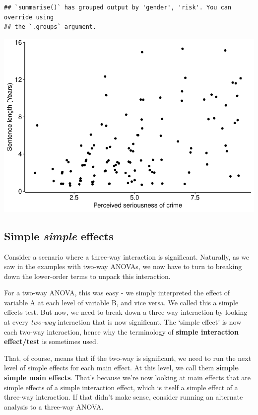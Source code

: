 \documentclass[
]{book}
\begin{document}
\begin{verbatim}
## `summarise()` has grouped output by 'gender', 'risk'. You can override using
## the `.groups` argument.
\end{verbatim}

\includegraphics{_main_files/figure-latex/unnamed-chunk-266-1.pdf}

\subsection{\texorpdfstring{Simple \emph{simple} effects}{Simple simple effects}}\label{simple-simple-effects}

Consider a scenario where a three-way interaction is significant. Naturally, as we saw in the examples with two-way ANOVAs, we now have to turn to breaking down the lower-order terms to unpack this interaction.

For a two-way ANOVA, this was easy - we simply interpreted the effect of variable A at each level of variable B, and vice versa. We called this a simple effects test. But now, we need to break down a three-way interaction by looking at every \emph{two-way} interaction that is now significant. The `simple effect' is now each two-way interaction, hence why the terminology of \textbf{simple interaction effect/test} is sometimes used.

That, of course, means that if the two-way is significant, we need to run the next level of simple effects for each main effect. At this level, we call them \textbf{simple simple main effects}. That's because we're now looking at main effects that are simple effects of a simple interaction effect, which is itself a simple effect of a three-way interaction. If that didn't make sense, consider running an alternate analysis to a three-way ANOVA.
\end{document}
